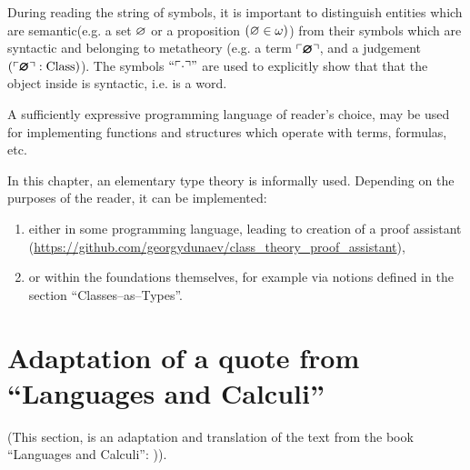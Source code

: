 During reading the string of symbols, it is important to distinguish entities which are semantic(e.g. a set $\varnothing$ or a proposition $(\varnothing \in \omega)$) from their symbols which are syntactic and belonging to metatheory (e.g. a term $\ulcorner\pmb{\varnothing}\urcorner$, and a judgement $(\ulcorner\pmb{\varnothing}\urcorner : {\text{Class}})$). The symbols $``\ulcorner\cdot\urcorner"$ are used to explicitly show that that the object inside is syntactic, i.e. is a word. 




A sufficiently expressive programming language of reader's choice, may be used for implementing functions and structures which operate with terms, formulas, etc.

In this chapter, an elementary type theory is informally used.
Depending on the purposes of the reader, it can be implemented:
\begin{enumerate}
\item either in some programming language, leading to creation of a proof assistant (\url{https://github.com/georgydunaev/class_theory_proof_assistant}),
\item or within the foundations themselves, for example via notions defined in the section ``Classes--as--Types''.
\end{enumerate}

\pagebreak

\fi%
\iffalse %
\section{Adaptation of a quote from ``Languages and Calculi''}
(This section, is an adaptation and translation of the text from the book ``Languages and Calculi'': \cite[73-74]{vereshchagin_shen_2012})).\\

